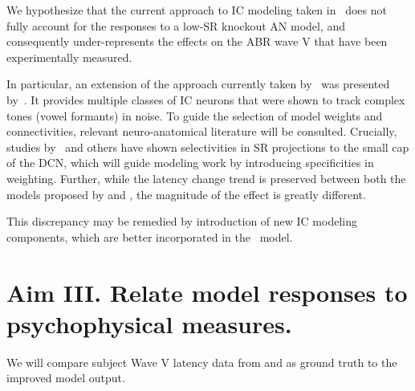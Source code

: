 We hypothesize that the current approach to IC modeling taken in~\cite{Verhulst2015Functional} does not fully account for the responses to a low-SR knockout AN model, and consequently under-represents the effects on the ABR wave V that have been experimentally measured.  

In particular, an extension of the approach currently taken by~\cite{Verhulst2015Functional} was presented by~\cite{Carney2015Speech}.  It provides multiple classes of IC neurons that were shown to track complex tones (vowel formants) in noise.  To guide the selection of model weights and connectivities, relevant neuro-anatomical literature will be consulted.  Crucially, studies by~\cite{Ryugo2008Projections} and others have shown selectivities in SR projections to the small cap of the DCN, which will guide modeling work by introducing specificities in weighting. Further, while the latency change trend is preserved between both the models proposed by \citeauthor{Zilany2014Updated} and \citeauthor{Verhulst2015Functional}, the magnitude of the effect is greatly different.  

This discrepancy may be remedied by introduction of new IC modeling components, which are better incorporated in the~\cite{Zilany2014Updated} model.

\section{Aim III.  Relate model responses to psychophysical measures.}  
We will compare subject Wave V latency data from \citeauthor{Mehraei2015Auditory} and \citeauthor{Mehraei2015Individual} as ground truth to the improved model output.